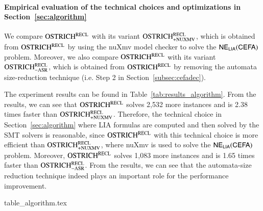 
\paragraph*{Empirical evaluation of the technical choices and optimizations in Section~\ref{sec:algorithm}}
We compare $\rm OSTRICH^{RECL}$ with its variant  $\rm OSTRICH^{RECL}_{\rm +NUXMV}$, which is obtained from $\rm OSTRICH^{RECL}$ by using the nuXmv model checker to solve the ${\sf NE_{LIA}(CEFA)}$ problem. Moreover, we also compare $\rm OSTRICH^{RECL}$ with its variant $\rm OSTRICH^{RECL}_{\rm -ASR}$, which is obtained from $\rm OSTRICH^{RECL}$ by removing the automata size-reduction technique (i.e. Step 2 in Section~\ref{subsec:cefadec}). 

The experiment results can be found in Table~\ref{tab:results_algorithm}. From the results, we can see that $\rm OSTRICH^{RECL}$ solves 2,532 more instances and is 2.38 times faster than $\rm OSTRICH^{RECL}_{\rm +NUXMV}$. 
Therefore, the technical choice in Section~\ref{sec:algorithm} where LIA formulas are computed and then solved by the SMT solvers is reasonable, since $\rm OSTRICH^{RECL}$ with this technical choice is more efficient than $\rm OSTRICH^{RECL}_{\rm +NUXMV}$, where nuXmv is used to solve the ${\sf NE_{LIA}(CEFA)}$ problem. 
%
Moreover, $\rm OSTRICH^{RECL}$ solves 1,083 more instances and is 1.65 times faster than $\rm OSTRICH^{RECL}_{\rm -ASR}$. 
From the results, we can see that the automata-size reduction technique indeed plays an important role for the performance improvement. 

\begin{table}
  {table_algorithm.tex}
  \caption{Evaluation of the technical choices and optimizations in Section~\ref{sec:algorithm}}\label{tab:results_algorithm}
\end{table}


